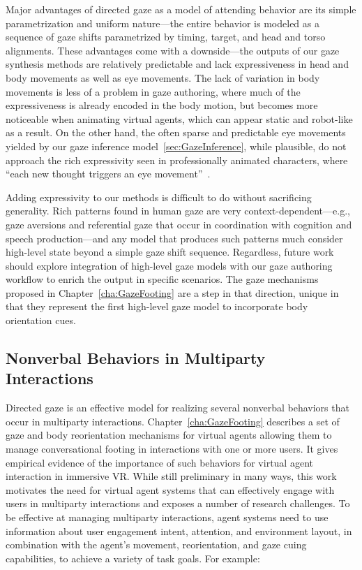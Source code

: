 Major advantages of directed gaze as a model of attending behavior are its simple parametrization and uniform nature---the entire behavior is modeled as a sequence of gaze shifts parametrized by timing, target, and head and torso alignments. These advantages come with a downside---the outputs of our gaze synthesis methods are relatively predictable and lack expressiveness in head and body movements as well as eye movements. The lack of variation in body movements is less of a problem in gaze authoring, where much of the expressiveness is already encoded in the body motion, but becomes more noticeable when animating virtual agents, which can appear static and robot-like as a result.
On the other hand, the often sparse and predictable eye movements yielded by our gaze inference model~\ref{sec:GazeInference}, while plausible, do not approach the rich expressivity seen in professionally animated characters, where ``each new thought triggers an eye movement''~\citep{maestri2001digital}.

Adding expressivity to our methods is difficult to do without sacrificing generality. Rich patterns found in human gaze are very context-dependent---e.g., gaze aversions and referential gaze that occur in coordination with cognition and speech production---and any model that produces such patterns much consider high-level state beyond a simple gaze shift sequence.
Regardless, future work should explore integration of high-level gaze models with our gaze authoring workflow to enrich the output in specific scenarios. The gaze mechanisms proposed in Chapter~\ref{cha:GazeFooting} are a step in that direction, unique in that they represent the first high-level gaze model to incorporate body orientation cues.

\subsection{Nonverbal Behaviors in Multiparty Interactions}

Directed gaze is an effective model for realizing several nonverbal behaviors that occur in multiparty interactions. Chapter~\ref{cha:GazeFooting} describes a set of gaze and body reorientation mechanisms for virtual agents allowing them to manage conversational footing in interactions with one or more users. It gives empirical evidence of the importance of such behaviors for virtual agent interaction in immersive VR. While still preliminary in many ways, this work motivates the need for virtual agent systems that can effectively engage with users in multiparty interactions and exposes a number of research challenges. To be effective at managing multiparty interactions, agent systems need to use information about user engagement intent, attention, and environment layout, in combination with the agent's movement, reorientation, and gaze cuing capabilities, to achieve a variety of task goals. For example:

